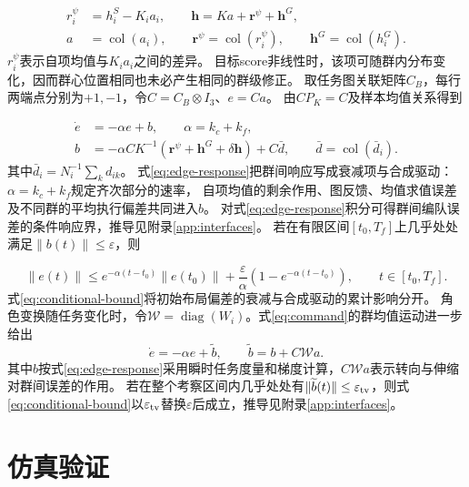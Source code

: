 \documentclass[UTF8,a4paper,11pt,fontset=none]{ctexart}
\newcommand{\diag}{\operatorname{diag}}\newcommand{\col}{\operatorname{col}}
\begin{document}
\begin{equation}
\begin{aligned}
r_i^\psi&=h_i^S-K_i a_i,\qquad \mathbf h=Ka+\mathbf r^\psi+\mathbf h^G,\\
a&=\col(a_i),\qquad \mathbf r^\psi=\col(r_i^\psi),\qquad\mathbf h^G=\col(h_i^G).
\end{aligned}
\label{eq:shape-drive}
\end{equation}
$r_i^\psi$表示自项均值与$K_i a_i$之间的差异。
目标score非线性时，该项可随群内分布变化，因而群心位置相同也未必产生相同的群级修正。
取任务图关联矩阵$C_B$，每行两端点分别为$+1,-1$，令$C=C_B\otimes I_3$、$e=Ca$。
由$CP_K=C$及样本均值关系得到

\begin{equation}
\begin{aligned}
\dot e&=-\alpha e+b,\qquad\alpha=k_c+k_f,\\
b&=-\alpha CK^{-1}(\mathbf r^\psi+\mathbf h^G+\delta\mathbf h)+C\bar d,
\qquad\bar d=\col(\bar d_i).
\end{aligned}
\label{eq:edge-response}
\end{equation}
其中$\bar d_i=N_i^{-1}\sum_kd_{ik}$。
式\eqref{eq:edge-response}把群间响应写成衰减项与合成驱动：$\alpha=k_c+k_f$规定齐次部分的速率，
自项均值的剩余作用、图反馈、均值求值误差及不同群的平均执行偏差共同进入$b$。
对式\eqref{eq:edge-response}积分可得群间编队误差的条件响应界，推导见附录\ref{app:interfaces}。
若在有限区间$[t_0,T_f]$上几乎处处满足$\|b(t)\|\le\varepsilon$，则

\begin{equation}
\|e(t)\|\le e^{-\alpha(t-t_0)}\|e(t_0)\|
+\frac\varepsilon\alpha\left(1-e^{-\alpha(t-t_0)}\right),\qquad t\in[t_0,T_f].
\label{eq:conditional-bound}
\end{equation}
式\eqref{eq:conditional-bound}将初始布局偏差的衰减与合成驱动的累计影响分开。
角色变换随任务变化时，令$\mathcal W=\diag(W_i)$。式\eqref{eq:command}的群均值运动进一步给出
\begin{equation}
\dot e=-\alpha e+\widetilde b,\qquad
\widetilde b=b+C\mathcal W a .
\label{eq:edge-response-varying}
\end{equation}
其中$b$按式\eqref{eq:edge-response}采用瞬时任务度量和梯度计算，$C\mathcal W a$表示转向与伸缩对群间误差的作用。
若在整个考察区间内几乎处处有$\|\widetilde b(t)\|\le\varepsilon_{\rm tv}$，则式\eqref{eq:conditional-bound}以$\varepsilon_{\rm tv}$替换$\varepsilon$后成立，推导见附录\ref{app:interfaces}。

\FloatBarrier
\section{仿真验证}\label{sec:experiments}
\end{document}
